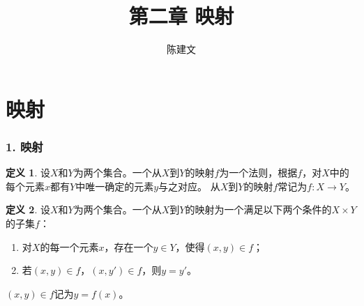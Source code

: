 \documentclass{beamer}
\begin{document}
\begin{CJK*}{UTF8}{gbsn}

\newtheorem{Thm}{定理}[section]
\newtheorem*{Thm5.4}{定理5.4}
\newtheorem{Cor}{推论}[section]
\theoremstyle{definition}
\newtheorem{Def}{定义}[section]
\theoremstyle{example}
\newtheorem*{Ex}{例：}
\newtheorem*{Exercise}{习题}

\date{}
\author{陈建文}

\title{第二章 映射}
\begin{frame}
  \titlepage
\end{frame}  
\section{映射}
\begin{frame}
  \frametitle{1. 映射}
  
  \begin{Def}
    设$X$和$Y$为两个集合。一个从$X$到$Y$的\alert{映射}$f$为一个法则，根据$f$，对$X$中的每个元素$x$都有$Y$中唯一确定的元素$y$与之对应。
    从$X$到$Y$的映射$f$常记为$f:X\to Y$。
  \end{Def}\pause

  \begin{Def}
    设$X$和$Y$为两个集合。一个从$X$到$Y$的映射为一个满足以下两个条件的$X\times Y$的子集$f$：
    \begin{enumerate}
    \item 对$X$的每一个元素$x$，存在一个$y\in Y$，使得$(x,y) \in f$；
    \item 若$(x,y)\in f$，$(x,y')\in f$，则$y=y'$。
    \end{enumerate}
    $(x,y)\in f$记为$y=f(x)$。
  \end{Def}\pause


\end{frame}
\end{CJK*}
\end{document}
